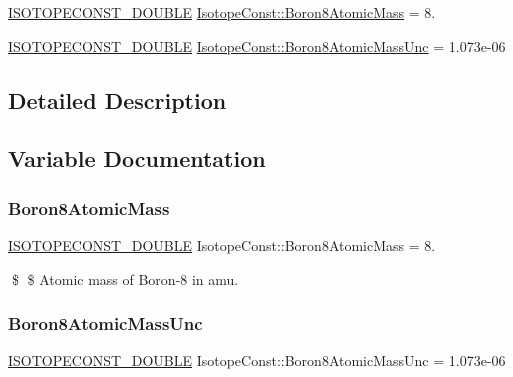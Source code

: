 \begin{DoxyCompactItemize}
\item 
\mbox{\hyperlink{group___isotope_const-_macros_ga8f45a7272ce02c0b4c65c44636ed719a}{I\+S\+O\+T\+O\+P\+E\+C\+O\+N\+S\+T\+\_\+\+D\+O\+U\+B\+LE}} \mbox{\hyperlink{group___isotope_const-_boron-_b8_ga4a440551fe9f426f1b4c9c44543836f9}{Isotope\+Const\+::\+Boron8\+Atomic\+Mass}} = 8.
\item 
\mbox{\hyperlink{group___isotope_const-_macros_ga8f45a7272ce02c0b4c65c44636ed719a}{I\+S\+O\+T\+O\+P\+E\+C\+O\+N\+S\+T\+\_\+\+D\+O\+U\+B\+LE}} \mbox{\hyperlink{group___isotope_const-_boron-_b8_gaf2ea7a0ef3cf2b2e9e446f591f5c5628}{Isotope\+Const\+::\+Boron8\+Atomic\+Mass\+Unc}} = 1.\+073e-\/06
\end{DoxyCompactItemize}


\subsection{Detailed Description}


\subsection{Variable Documentation}
\mbox{\label{group___isotope_const-_boron-_b8_ga4a440551fe9f426f1b4c9c44543836f9}} 
\subsubsection{\texorpdfstring{Boron8\+Atomic\+Mass}{Boron8AtomicMass}}
{\footnotesize\ttfamily \mbox{\hyperlink{group___isotope_const-_macros_ga8f45a7272ce02c0b4c65c44636ed719a}{I\+S\+O\+T\+O\+P\+E\+C\+O\+N\+S\+T\+\_\+\+D\+O\+U\+B\+LE}} Isotope\+Const\+::\+Boron8\+Atomic\+Mass = 8.}

\$ \$ Atomic mass of Boron-\/8 in amu. \mbox{\label{group___isotope_const-_boron-_b8_gaf2ea7a0ef3cf2b2e9e446f591f5c5628}} 
\subsubsection{\texorpdfstring{Boron8\+Atomic\+Mass\+Unc}{Boron8AtomicMassUnc}}
{\footnotesize\ttfamily \mbox{\hyperlink{group___isotope_const-_macros_ga8f45a7272ce02c0b4c65c44636ed719a}{I\+S\+O\+T\+O\+P\+E\+C\+O\+N\+S\+T\+\_\+\+D\+O\+U\+B\+LE}} Isotope\+Const\+::\+Boron8\+Atomic\+Mass\+Unc = 1.\+073e-\/06}

